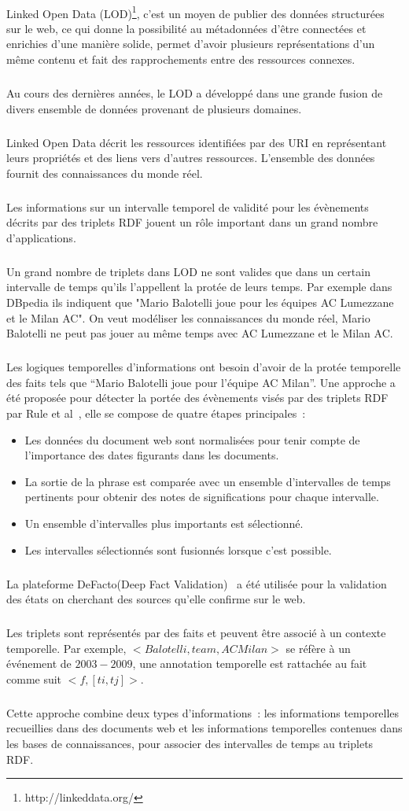 \documentclass[12pt,a4	]{report}
\begin{document}
\paragraph{}
Linked Open Data (LOD)\footnote{http://linkeddata.org/}, c'est un moyen de publier des données structurées sur le web, ce qui donne la possibilité au métadonnées d'être connectées et enrichies d'une manière solide, permet d'avoir plusieurs représentations d'un même contenu et fait des rapprochements entre des ressources connexes. 
\subparagraph{}
Au cours des dernières années, le LOD a développé dans une grande fusion de divers ensemble de données provenant de plusieurs domaines.
\subparagraph{}
Linked Open Data décrit les ressources identifiées par des URI en représentant leurs propriétés et des liens vers d’autres ressources. L'ensemble des données fournit des connaissances du monde réel.
\subparagraph{}
Les informations sur un intervalle temporel de validité pour les évènements décrits par des triplets RDF jouent un rôle important dans un grand nombre d'applications.
\subparagraph{}
Un grand nombre de triplets dans LOD ne sont valides que dans un certain intervalle de temps qu'ils l'appellent la protée de leurs temps.
Par exemple dans DBpedia ils indiquent que "Mario Balotelli joue pour les équipes AC Lumezzane et le Milan AC". On veut modéliser les connaissances du monde réel, Mario Balotelli ne peut pas jouer au même temps avec AC Lumezzane et le Milan AC.
\subparagraph{}
Les logiques temporelles d'informations ont besoin d'avoir de la protée temporelle des faits tels que “Mario Balotelli joue pour l'équipe AC Milan”.
Une approche a été proposée pour détecter la portée des évènements visés par des triplets RDF par Rule et al~\cite{rula2013}, elle se compose de quatre étapes principales~:
\begin{itemize}
\item Les données du document web sont normalisées pour tenir compte de l’importance des dates figurants dans les documents.
\item La sortie de la phrase est comparée avec un ensemble d’intervalles de temps pertinents pour obtenir des notes de significations pour chaque intervalle.
\item Un ensemble d’intervalles plus importants est sélectionné.
\item Les intervalles sélectionnés sont fusionnés lorsque c’est possible.
\end{itemize}
\subparagraph{}
La plateforme DeFacto(Deep Fact Validation)~\cite{lehmann2012} a été utilisée pour la validation des états on cherchant des sources qu'elle confirme sur le web.
\subparagraph{}
Les triplets sont représentés par des faits et peuvent être associé à un contexte temporelle.
Par exemple, $<Balotelli, team, AC Milan>$ se réfère à un événement de $2003-2009$, une annotation temporelle est rattachée au fait comme suit $<f, [ti,tj]>$.
\subparagraph{}
Cette approche combine deux types d'informations~: les informations temporelles recueillies dans des documents web et les informations temporelles contenues dans les bases de connaissances, pour associer des intervalles de temps au triplets RDF.
\end{document}
